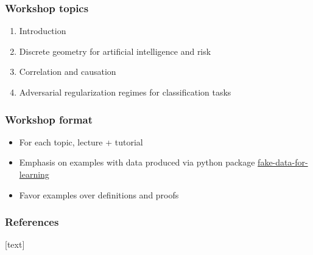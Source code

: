 \begin{frame}
\frametitle{Workshop topics}
\begin{enumerate}
\item Introduction
\item Discrete geometry for artificial intelligence and risk
\item Correlation and causation
\item Adversarial regularization regimes for classification tasks
\end{enumerate}
\end{frame}

\begin{frame}
\frametitle{Workshop format}

\begin{itemize}
\item For each topic, lecture + tutorial
\item Emphasis on examples with data produced via python package \href{https://munichpavel.github.io/fake-data-for-learning/}{fake-data-for-learning}
\item Favor examples over definitions and proofs
\end{itemize}
\end{frame}

\begin{frame}[allowframebreaks]
  \frametitle{References}
  [text]
  
  
\end{frame}



